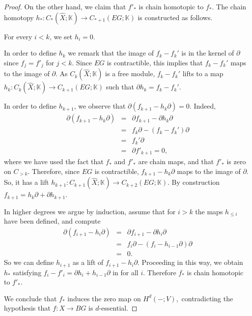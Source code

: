 \documentclass[11pt,letterpaper]{amsart}
\begin{document}
\begin{proof}
On the other hand, we claim that $f'_*$ is chain homotopic to $f_*$.
The chain homotopy $h_*:C_{*}(\hat X;\mathbb K)\rightarrow C_{*+1}(EG;\mathbb K)$ is constructed as follows. 

For every $i<k$, we set $h_i=0$. 

In order to define $h_k$ we remark that the image of $f_k-f_k'$ is in the kernel of $\partial$ since $f_j=f'_j$  for $j<k$. Since $EG$ is contractible, this implies that $f_k-f_k'$ maps to the image of $\partial$. As $C_k(\hat X;
\mathbb K)$ is a free module, $f_k-f_k'$ lifts to a map $h_k:C_k(\hat X;\mathbb K)\rightarrow C_{k+1}(EG;\mathbb K)$ such that $\partial h_k=f_k-f_k'$. 

In order to define $h_{k+1}$, we observe that $\partial(f_{k+1}-h_k\partial)=0$. Indeed, 
\begin{eqnarray*}
\partial(f_{k+1}-h_k\partial)&=&\partial f_{k+1}-\partial h_k\partial \\
&=&f_k\partial-(f_k-f_k')\partial\\
&=&f_k'\partial\\
&=&\partial f'_{k+1}=0,
\end{eqnarray*}
where we have used the fact that $f_*$ and $f'_*$ are chain maps, and that $f'_*$ is zero on $C_{>k}$. Therefore, since $EG$ is contractible, $f_{k+1}-h_k\partial$ maps to the image of $\partial$. So, it has a lift $h_{k+1}:C_{k+1}(\hat X;\mathbb K)\rightarrow C_{k+2}(EG;\mathbb K)$. By construction $f_{k+1}=h_k\partial+\partial h_{k+1}$. 

In higher degrees we argue by induction, assume that for $i>k$ the maps $h_{\leq i}$ have been defined, and compute
\begin{eqnarray*}
\partial(f_{i+1}-h_i\partial)&=&\partial f_{i+1}-\partial h_i\partial\\
&=&f_i\partial-(f_i-h_{i-1}\partial)\partial\\
&=&0.
\end{eqnarray*}
So we can define $h_{i+1}$ as a lift of $f_{i+1}-h_i\partial$. Proceeding in this way, we obtain $h_*$ satisfying $f_i-f'_i=\partial h_i+h_{i-1}\partial$ in for all $i$. Therefore $f_*$ is chain homotopic to $f'_*$.

We conclude that $f_*$ induces the zero map on $H^d(-;V),$ contradicting the hypothesis that $f:X\rightarrow BG$ is $d$-essential. 
\end{proof}
\end{document}

